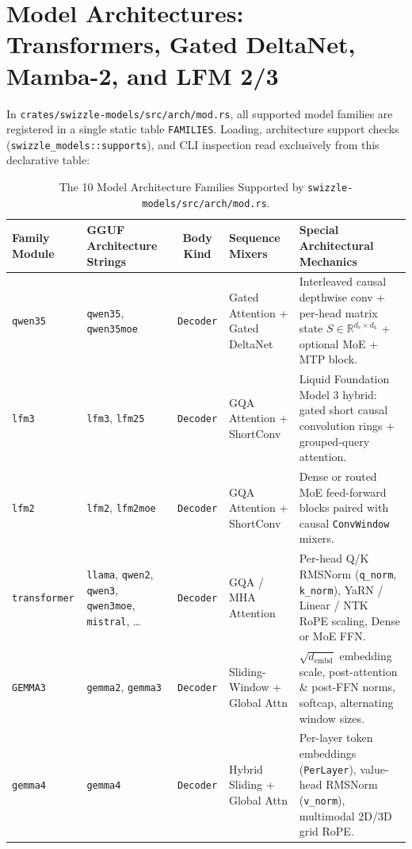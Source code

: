 \documentclass[10pt,a4paper]{article}
\theoremstyle{swzstyle}
\newcommand{\code}[1]{\texttt{#1}}
\begin{document}
\section{Model Architectures: Transformers, Gated DeltaNet, Mamba-2, and LFM 2/3}

In \code{crates/swizzle-models/src/arch/mod.rs}, all supported model families are registered in a single static table \code{FAMILIES}. Loading, architecture support checks (\code{swizzle\_models::supports}), and CLI inspection read exclusively from this declarative table:

\begin{table}[htbp]
  \centering
  \caption{The 10 Model Architecture Families Supported by \texttt{swizzle-models/src/arch/mod.rs}.}
  \label{tab:arch_families}
  \footnotesize
  \begin{tabularx}{\textwidth}{@{}llclX@{}}
    \toprule
    \sffamily\bfseries Family Module & \sffamily\bfseries GGUF Architecture Strings & \sffamily\bfseries Body Kind & \sffamily\bfseries Sequence Mixers & \sffamily\bfseries Special Architectural Mechanics \\
    \midrule
    \code{qwen35} & \code{qwen35}, \code{qwen35moe} & \code{Decoder} & Gated Attention + Gated DeltaNet & Interleaved causal depthwise conv + per-head matrix state $S \in \mathbb{R}^{d_v \times d_k}$ + optional MoE + MTP block. \\
    \code{lfm3} & \code{lfm3}, \code{lfm25} & \code{Decoder} & GQA Attention + ShortConv & Liquid Foundation Model 3 hybrid: gated short causal convolution rings + grouped-query attention. \\
    \code{lfm2} & \code{lfm2}, \code{lfm2moe} & \code{Decoder} & GQA Attention + ShortConv & Dense or routed MoE feed-forward blocks paired with causal \code{ConvWindow} mixers. \\
    \code{transformer} & \code{llama}, \code{qwen2}, \code{qwen3}, \code{qwen3moe}, \code{mistral}, \dots & \code{Decoder} & GQA / MHA Attention & Per-head Q/K RMSNorm (\code{q\_norm}, \code{k\_norm}), YaRN / Linear / NTK RoPE scaling, Dense or MoE FFN. \\
    \code{GEMMA3} & \code{gemma2}, \code{gemma3} & \code{Decoder} & Sliding-Window + Global Attn & $\sqrt{d_{\text{embd}}}$ embedding scale, post-attention \& post-FFN norms, softcap, alternating window sizes. \\
    \code{gemma4} & \code{gemma4} & \code{Decoder} & Hybrid Sliding + Global Attn & Per-layer token embeddings (\code{PerLayer}), value-head RMSNorm (\code{v\_norm}), multimodal 2D/3D grid RoPE. \\

\end{tabularx}
\end{table}
\end{document}
